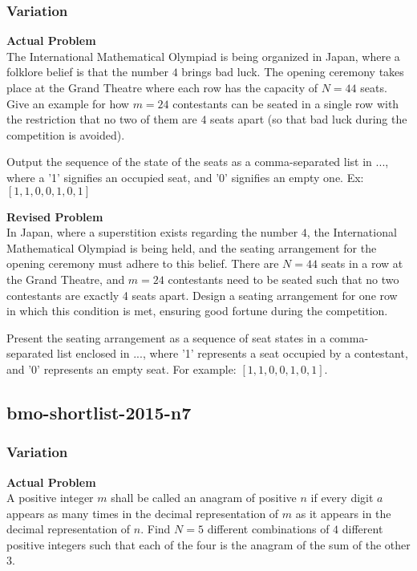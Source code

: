 \subsubsection{Variation}
\textbf{Actual Problem}\\
The International Mathematical Olympiad is being organized in Japan, where a folklore belief is that the number $4$ brings bad luck. The opening ceremony takes place at the Grand Theatre where each row has the capacity of $N=44$ seats. Give an example for how $m = 24$ contestants can be seated in a single row with the restriction that no two of them are $4$ seats apart (so that bad luck during the competition is avoided).

Output the sequence of the state of the seats as a comma-separated list in $\boxed{...}$, where a '1' signifies an occupied seat, and '0' signifies an empty one. Ex: $\boxed{[1,1,0,0,1,0,1]}$

\textbf{Revised Problem}\\
In Japan, where a superstition exists regarding the number $4$, the International Mathematical Olympiad is being held, and the seating arrangement for the opening ceremony must adhere to this belief. There are $N=44$ seats in a row at the Grand Theatre, and $m = 24$ contestants need to be seated such that no two contestants are exactly 4 seats apart. Design a seating arrangement for one row in which this condition is met, ensuring good fortune during the competition.

Present the seating arrangement as a sequence of seat states in a comma-separated list enclosed in $\boxed{...}$, where '1' represents a seat occupied by a contestant, and '0' represents an empty seat. For example: $\boxed{[1,1,0,0,1,0,1]}$.

\subsection{bmo-shortlist-2015-n7}
\subsubsection{Variation}
\textbf{Actual Problem}\\
A positive integer $m$ shall be called an anagram of positive $n$ if every digit $a$ appears as many times in the decimal representation of $m$ as it appears in the decimal representation of $n$. Find $N=5$ different combinations of $4$ different positive integers such that each of the four is the anagram of the sum of the other $3$.

